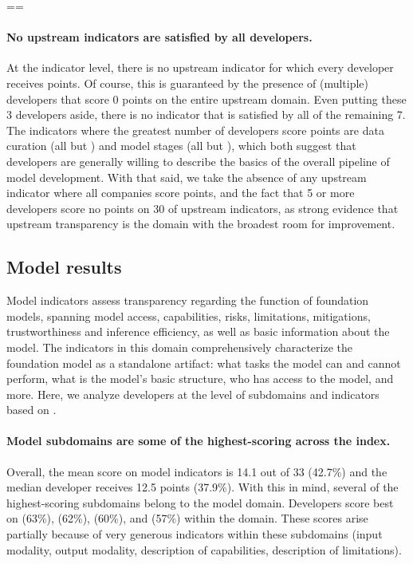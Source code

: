 \clearpage

\eject
\pdfpagewidth=\originalwidth \pdfpageheight=\originalheight
{}


\paragraph{No upstream indicators are satisfied by all developers.}
At the indicator level, there is no upstream indicator for which every developer receives points.
Of course, this is guaranteed by the presence of (multiple) developers that score 0 points on the entire upstream domain.
Even putting these 3 developers aside, there is no indicator that is satisfied by all of the remaining 7.
The indicators where the greatest number of developers score points are data curation (all but \anthropic) and model stages (all but \cohere), which both suggest that developers are generally willing to describe the basics of the overall pipeline of model development.
With that said, we take the absence of any upstream indicator where all companies score points, and the fact that 5 or more developers score no points on 30 of \numupstreamindicators upstream indicators, as strong evidence that upstream transparency is the domain with the broadest room for improvement.

\hypertarget{model-results}{\subsection{Model results}}
\label{sec:model-results}

Model indicators assess transparency regarding the function of foundation models, spanning model access, capabilities, risks, limitations, mitigations, trustworthiness and inference efficiency, as well as basic information about the model. 
The indicators in this domain comprehensively characterize the foundation model as a standalone artifact: what tasks the model can and cannot perform, what is the model's basic structure, who has access to the model, and more. 
Here, we analyze developers at the level of subdomains and indicators based on .


\paragraph{Model subdomains are some of the highest-scoring across the index.}
Overall, the mean score on model indicators is 14.1 out of 33 (42.7\%) and the median developer receives 12.5 points (37.9\%). 
With this in mind, several of the highest-scoring subdomains belong to the model domain.
Developers score best on \modelbasics (63\%), \capabilities (62\%), \limitations (60\%), and \modelaccess (57\%) within the domain.
These scores arise partially because of very generous indicators within these subdomains (\eg input modality, output modality, description of capabilities, description of limitations).

